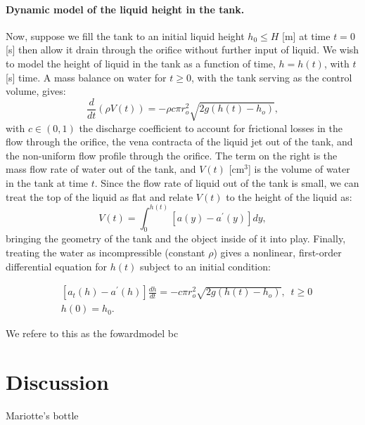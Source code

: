 \documentclass[openacc]{rsproca_new}%
\begin{document}
\paragraph{Dynamic model of the liquid height in the tank.} Now, suppose we fill the tank to an initial liquid height $h_0 \leq H$ [m] at time $t=0$ [s] then allow it drain through the orifice without further input of liquid. We wish to model the height of liquid in the tank as a function of time, $h=h(t)$, with $t$ [s] time. 
A mass balance on water for $t\geq 0$, with the tank serving as the control volume, gives:
\begin{equation}
	\frac{d}{dt} \left ( \rho V(t) \right) = - \rho c \pi r_o^2 \sqrt{2 g(h(t)-h_o)},
\end{equation}
with $c\in(0,1)$ the discharge coefficient \cite{lienhard1984velocity,hicks2014determining,wadhwa2021study,teoman2022discharge} to account for frictional losses in the flow through the orifice, the vena contracta of the liquid jet out of the tank, and the non-uniform flow profile through the orifice. The term on the right is the mass flow rate of water out of the tank, and $V(t)$ [cm$^3$] is the volume of water in the tank at time $t$. 
Since the flow rate of liquid out of the tank is small, we can treat the top of the liquid as flat and relate $V(t)$ to the height of the liquid as: 
\begin{equation}
	V(t)=\int_0^{h(t)} [a(y) - a^\prime(y)]dy,
\end{equation}
bringing the geometry of the tank and the object inside of it into play. Finally, treating the water as incompressible (constant $\rho$) gives a nonlinear, first-order differential equation for $h(t)$ subject to an initial condition:

\begin{align}
& [a_t(h)-a^\prime(h)]\frac{dh}{dt}= -c \pi r_o^2 \sqrt{2g (h(t)-h_o)}, \,\,\, t \geq 0 \\
& h(0)=h_0.
\end{align}

We refere to this as the fowardmodel bc

\section{Discussion}

Mariotte's bottle \cite{kirevs2006mariotte}

\enlargethispage{20pt}




\vskip2pc



\end{document}
